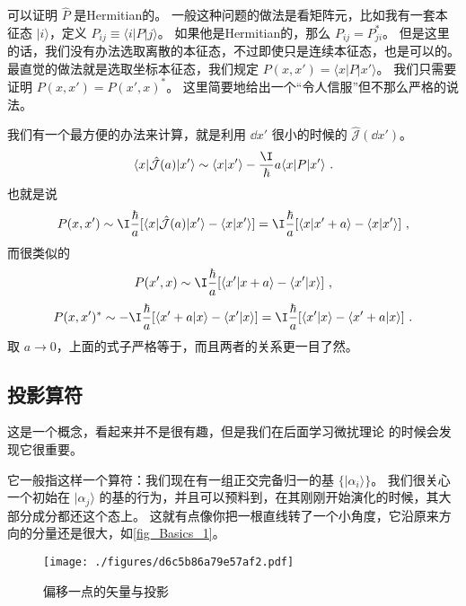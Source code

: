 \begin{example}{}
可以证明 $\hat{P}$ 是Hermitian的。 一般这种问题的做法是看矩阵元，比如我有一套本征态 $|i\rangle$，定义 $P_{ij} \equiv \langle i|P|j\rangle$。 如果他是Hermitian的，那么 $P_{ij} = P_{ji}^*$。 但是这里的话，我们没有办法选取离散的本征态，不过即使只是连续本征态，也是可以的。 最直觉的做法就是选取坐标本征态，我们规定 $P(x,x') = \langle x|P|x'\rangle$。 我们只需要证明 $P(x,x') = P(x',x)^*$。 这里简要地给出一个“令人信服”但不那么严格的说法。

我们有一个最方便的办法来计算，就是利用 $\dd{x'}$ 很小的时候的 $\hat{\mathcal{J}}(\dd{x'})$。
\begin{equation}
\langle x|\hat{\mathcal{J}}(a)|x'\rangle \sim \langle x|x'\rangle - \frac{\I}{\hbar} a \langle x|P|x'\rangle~.
\end{equation}
也就是说
\begin{equation}
P(x,x') \sim \I\frac{\hbar}{a}[\langle x|\hat{\mathcal{J}}(a)|x'\rangle - \langle x|x'\rangle] = \I\frac{\hbar}{a}[\langle x|x'+a\rangle - \langle x|x'\rangle]~,
\end{equation}
而很类似的
\begin{equation}
P(x',x) \sim \I\frac{\hbar}{a}[\langle x'|x+a\rangle - \langle x'|x\rangle]~,
\end{equation}
\begin{equation}
P(x,x')^* \sim -\I\frac{\hbar}{a} [\langle x'+a|x\rangle - \langle x'|x\rangle] = \I\frac{\hbar}{a} [\langle x'|x\rangle - \langle x'+a|x\rangle]~.
\end{equation}
取 $a\rightarrow0$，上面的式子严格等于，而且两者的关系更一目了然。
\end{example}

\subsection{投影算符}

这是一个概念，看起来并不是很有趣，但是我们在后面学习微扰理论%
的时候会发现它很重要。

它一般指这样一个算符：我们现在有一组正交完备归一的基 $\{|\alpha_i\rangle\}$。 我们很关心一个初始在 $|\alpha_j\rangle$ 的基的行为，并且可以预料到，在其刚刚开始演化的时候，其大部分成分都还这个态上。 这就有点像你把一根直线转了一个小角度，它沿原来方向的分量还是很大，如\autoref{fig_Basics_1}。

\begin{figure}[ht]
\centering
\texttt{[image: ./figures/d6c5b86a79e57af2.pdf]}
\caption{偏移一点的矢量与投影} \label{fig_Basics_1}
\end{figure}

